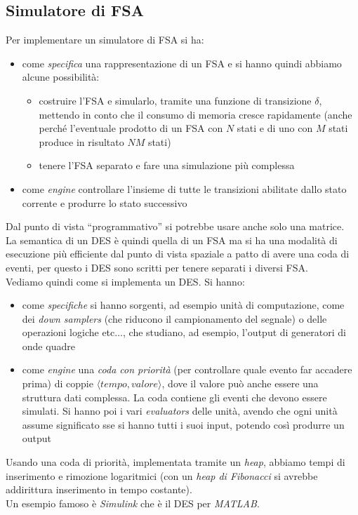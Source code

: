 \documentclass[a4paper,12pt, oneside]{book}
\begin{document}
\subsection{Simulatore di FSA}
Per implementare  un simulatore di FSA si ha:
\begin{itemize}
  \item come \textit{specifica} una rappresentazione di un FSA e si hanno quindi
  abbiamo alcune possibilità:
  \begin{itemize}
    \item costruire l'FSA e simularlo, tramite una funzione di transizione
    $\delta$, mettendo in conto che il consumo di 
    memoria cresce rapidamente (anche perché l'eventuale prodotto di un FSA con
    $N$ stati e di uno con $M$ stati produce in risultato $NM$ stati)
    \item tenere l'FSA separato e fare una simulazione più complessa
  \end{itemize}
  \item come \textit{engine} controllare l'insieme di tutte le transizioni
  abilitate dallo stato corrente e produrre lo stato successivo
\end{itemize}
Dal punto di vista ``programmativo'' si potrebbe usare anche solo una matrice.\\
La semantica di un DES è quindi quella di un FSA ma si ha una modalità di
esecuzione più efficiente dal punto di vista spaziale a patto di avere una coda
di eventi, per questo i DES sono scritti per tenere separati i diversi FSA. \\
Vediamo quindi come si implementa un DES. Si hanno:
\begin{itemize}
  \item come \textit{specifiche} si hanno sorgenti, ad esempio unità di
  computazione, come dei \textit{down samplers} (che riducono il campionamento
  del segnale) o delle operazioni logiche etc$\ldots$, che studiano, ad esempio,
  l'output di generatori di onde quadre 
  \item come \textit{engine} una \textit{coda con priorità} (per controllare
  quale evento far accadere prima) di coppie $\langle
  tempo, valore\rangle$, dove il valore può anche essere una struttura dati
  complessa. La coda contiene gli eventi che devono essere simulati. Si hanno
  poi i vari \textit{evaluators} delle unità, avendo che 
  ogni unità assume significato sse si hanno tutti i suoi input, potendo così
  produrre un output
\end{itemize}
Usando una coda di priorità, implementata tramite un \textit{heap}, abbiamo
tempi di inserimento e rimozione logaritmici (con un \textit{heap di Fibonacci}
si avrebbe addirittura inserimento in tempo costante). \\
Un esempio famoso è \textit{Simulink} che è il DES per \textit{MATLAB}.
\end{document}
